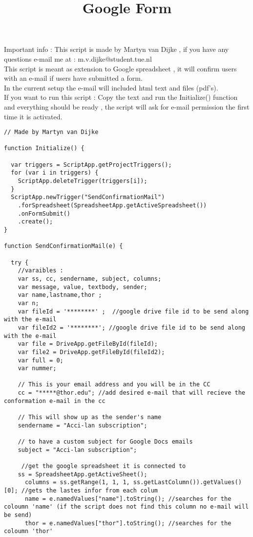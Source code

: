 \documentclass{article}
\title{Google Form}
\begin{document}
Important info : 
This script is made by Martyn van Dijke , if you have any questions e-mail me at : m.v.dijke@student.tue.nl \\ 
 This script is meant as extension to Google spreadsheet , it will confirm users with an  e-mail if users have submitted a form. \\
 In the current setup the e-mail will included html text and files (pdf's). \\


If you want to run this script : Copy the text and run the Initialize() function and everything should be ready , the script will ask for e-mail permission the first time it is activated. \\
\medskip
\begin{lstlisting}[caption = Google Form emailer ]
// Made by Martyn van Dijke

function Initialize() {
 
  var triggers = ScriptApp.getProjectTriggers();
  for (var i in triggers) {
    ScriptApp.deleteTrigger(triggers[i]);
  }
  ScriptApp.newTrigger("SendConfirmationMail")
    .forSpreadsheet(SpreadsheetApp.getActiveSpreadsheet())
    .onFormSubmit()
    .create();
}
 
function SendConfirmationMail(e) {
 
  try {
 	//varaibles : 
    var ss, cc, sendername, subject, columns;
    var message, value, textbody, sender;
    var name,lastname,thor ;
    var n;
    var fileId = '********' ;  //google drive file id to be send along with the e-mail
    var fileId2 = '********'; //google drive file id to be send along with the e-mail
    var file = DriveApp.getFileById(fileId);
    var file2 = DriveApp.getFileById(fileId2);
    var full = 0;
    var nummer; 
 
    // This is your email address and you will be in the CC
    cc = "*****@thor.edu"; //add desired e-mail that will recieve the conformation e-mail in the cc 
 
    // This will show up as the sender's name
    sendername = "Acci-lan subscription";
 
    // to have a custom subject for Google Docs emails
    subject = "Acci-lan subscription";
     
     //get the google spreadsheet it is connected to 
    ss = SpreadsheetApp.getActiveSheet();
      columns = ss.getRange(1, 1, 1, ss.getLastColumn()).getValues()[0]; //gets the lastes infor from each colum 
      name = e.namedValues["name"].toString(); //searches for the coloumn 'name' (if the script does not find this column no e-mail will be send)
      thor = e.namedValues["thor"].toString(); //searches for the coloumn 'thor' 
    

\end{lstlisting}
\end{document}

